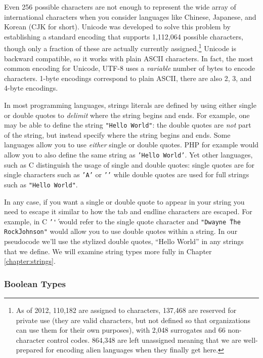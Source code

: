 Even 256 possible characters are not enough to represent the wide array of international
characters when you consider languages like Chinese, Japanese, and Korean (CJK for short).
Unicode was developed to solve this problem by establishing a standard encoding
that supports 1,112,064 possible characters, though only a fraction of these are actually
currently assigned.\footnote{As of 2012, 110,182 are assigned to characters, 137,468 are 
reserved for private use (they are valid characters, but not defined so that organizations can
use them for their own purposes), with 2,048 surrogates and 66 non-character control 
codes.  864,348 are left unassigned meaning that we are well-prepared for encoding
alien languages when they finally get here.}  Unicode is \gls{backward compatible}, so
it works with plain ASCII characters.  In fact, the most common encoding for Unicode, UTF-8 
uses a \emph{variable} number of bytes to encode characters.  1-byte encodings correspond
to plain ASCII, there are also 2, 3, and 4-byte encodings.

In most programming languages, strings \glspl{literal} are defined by using either single or
double quotes to \emph{delimit} where the string begins and ends.  For example, one may
be able to define the string \texttt{"Hello World"}: the double quotes are \emph{not}
part of the string, but instead specify where the string begins and ends.  Some languages
allow you to use \emph{either} single or double quotes.  PHP for example would allow you
to also define the same string as \texttt{'Hello World'}.  Yet other languages, such 
as C distinguish the usage of single and double quotes: single quotes are for single characters
such as \texttt{'A'} or \texttt{'\n'} while double quotes are used for full 
strings such as \texttt{"Hello World"}.

In any case, if you want a single or double quote to appear in your string you need to
escape it similar to how the tab and endline characters are escaped.  For example, in C 
\texttt{'\''} would refer to the single quote character and 
\texttt{"Dwayne \"The Rock\" Johnson"} would allow you to use double quotes
within a string.  In our pseudocode we'll use the stylized double quotes, ``Hello World'' 
in any strings that we define.  We will examine string types more fully in Chapter \ref{chapter:strings}.

\subsubsection{Boolean Types}

